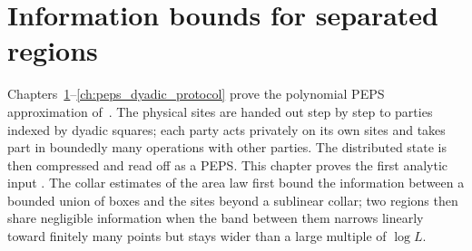 \chapter{Information bounds for separated regions}
\label{ch:peps_approximation}

Chapters~\ref{ch:peps_approximation}--\ref{ch:peps_dyadic_protocol} prove the
polynomial PEPS approximation of~\cite{OpenAI2026PolynomialPEPS}. The physical
sites are handed out step by step to parties indexed by dyadic squares; each
party acts privately on its own sites and takes part in boundedly many
operations with other parties. The distributed state is then compressed and
read off as a PEPS. This chapter proves the first analytic input
\cite[Section~3]{OpenAI2026PolynomialPEPS}. The collar estimates of the area law
first bound the information between a bounded union of boxes and the sites
beyond a sublinear collar; two regions then share negligible
information when the band between them narrows linearly toward finitely many
points but stays wider than a large multiple of $\log L$.







